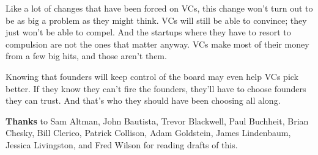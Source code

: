 Like a lot of
                    changes that have been forced on VCs, this change won't turn
                    out to be as big a problem as they might think. VCs will
                    still be able to convince; they just won't be able to
                    compel. And the startups where they have to resort to
                    compulsion are not the ones that matter anyway. VCs make
                    most of their money from a few big hits, and those aren't
                    them.

Knowing that founders will keep control of
                    the board may even help VCs pick better. If they know they
                    can't fire the founders, they'll have to choose founders
                    they can trust. And that's who they should have been
                    choosing all along.





\textbf{Thanks}
                    to Sam Altman, John Bautista, Trevor Blackwell, Paul
                    Buchheit, Brian Chesky, Bill Clerico, Patrick Collison, Adam
                    Goldstein, James Lindenbaum, Jessica Livingston, and Fred
                    Wilson for reading drafts of this.



              
            
          
            
              
                


                  
              
            
          
